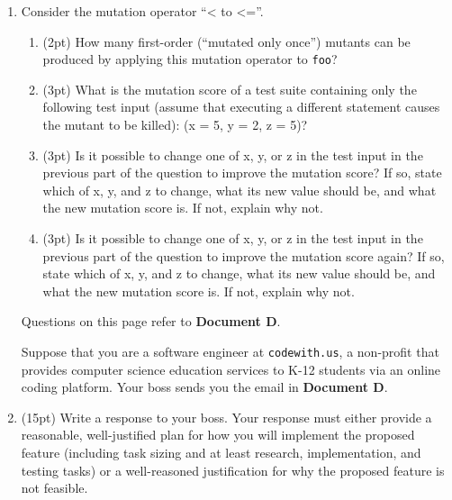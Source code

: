 \documentclass{report}
\newif\ifkey
\newcommand{\answershort}[1]{\ifkey\color{red}\underline{\textbf{#1}}\color{black}\else\underline{\hspace{3in}}\fi\xspace}
\newcommand{\answervshort}[1]{\ifkey\color{red}\underline{\textbf{#1}}\color{black}\else\underline{\hspace{1in}}\fi\xspace}
\newcommand{\answerlong}[1]{\ifkey\color{red}\textbf{#1}\color{black}\else\vspace{0.5in}\fi\xspace}
\newcommand*{\pts}[1]{\addtocounter{points}{#1}(#1pt)}
\begin{document}
\begin{spacing}{1.4}
\begin{enumerate}[leftmargin=*]
  \item \label{el1} Consider the mutation operator ``< to <=''.
    \begin{enumerate}
    \item \pts{2} How many first-order (``mutated only once'') mutants can be produced by applying this mutation operator
    to \lstinline$foo$?\\ \answervshort{2}
    \item \pts{3} What is the mutation score of a test suite containing only the following test input (assume that executing a different statement causes the mutant to be killed):
    (x = 5, y = 2, z = 5)?\\ \answershort{0\%}
    \item \pts{3} Is it possible to change one of x, y, or z in the test input in the previous part of the question to improve the mutation score?
    If so, state which of x, y, and z to change, what its new value should be, and what the new mutation score is. If not, explain
    why not. \\
    \answerlong{z = 6 changes the mutation score to 50\%}
    \item \pts{3} Is it possible to change one of x, y, or z in the test input in the previous part of the question to improve the mutation score again?
    If so, state which of x, y, and z to change, what its new value should be, and what the new mutation score is. If not, explain
    why not. \\
    \answerlong{It is not, because the second mutant is an equivalent mutant.}
    \end{enumerate}

    \newpage

    Questions on this page refer to \textbf{Document D}.

    Suppose that you are a software engineer at \lstinline{codewith.us}, a non-profit that provides computer science education
    services to K-12 students via an online coding platform. Your boss sends you the email in \textbf{Document D}.

  \item \pts{15} Write a response to your boss. Your response must either provide a reasonable, well-justified plan
    for how you will implement the proposed feature (including task sizing and at least research, implementation, and testing tasks)
    or a well-reasoned justification for why the proposed feature is not feasible.

    \answerlong{The proposed feature is an instance of the halting problem, and Mr. Rice's insistence that
      you get the correct answer 100\% of the time means that it is impossible to implement the feature as described.
    Correct answers must be phrased as an email, and use a polite but firm tone.}


\end{enumerate}
\end{spacing}
\end{document}
